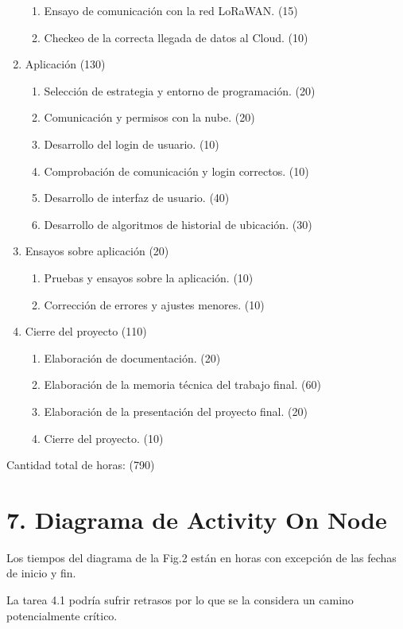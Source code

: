\documentclass[11pt]{charter}
\begin{document}
\begin{enumerate}
\begin{enumerate}
	\item Ensayo de comunicación con la red LoRaWAN. (15)
	\item Checkeo de la correcta llegada de datos al Cloud. (10)
	\end{enumerate}
\item Aplicación (130)
	\begin{enumerate}
	\item Selección de estrategia y entorno de programación. (20)
	\item Comunicación y permisos con la nube. (20)
	\item Desarrollo del login de usuario. (10)
	\item Comprobación de comunicación y login correctos. (10)
    \item Desarrollo de interfaz de usuario. (40)
	\item Desarrollo de algoritmos de historial de ubicación. (30)
	\end{enumerate}
\item Ensayos sobre aplicación (20)
	\begin{enumerate}
	\item Pruebas y ensayos sobre la aplicación. (10)
	\item Corrección de errores y ajustes menores. (10)
	\end{enumerate}
\item Cierre del proyecto (110)
	\begin{enumerate}
	\item Elaboración de documentación. (20)
	\item Elaboración de la memoria técnica del trabajo final. (60) 
	\item Elaboración de la presentación del proyecto final. (20)
	\item Cierre del proyecto. (10)
	\end{enumerate}
\end{enumerate}

Cantidad total de horas: (790)
 
\vspace{600px}

\section{7. Diagrama de Activity On Node}
\label{sec:AoN}

Los tiempos del diagrama de la Fig.2 están en horas con excepción de las fechas de inicio y fin.

La tarea 4.1 podría sufrir retrasos por lo que se la considera un camino potencialmente crítico. 
\end{document}
